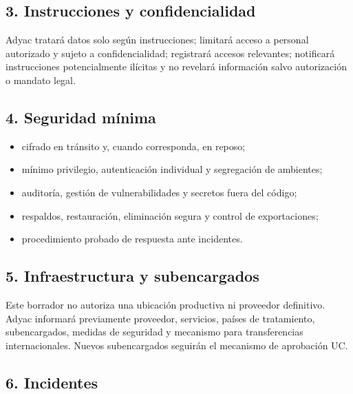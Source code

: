 \documentclass[
]{article}
\providecommand{\tightlist}{%
  \setlength{\itemsep}{0pt}\setlength{\parskip}{0pt}}
\begin{document}
\hypertarget{3-instrucciones-y-confidencialidad}{%
\subsection{3. Instrucciones y
confidencialidad}\label{3-instrucciones-y-confidencialidad}}

Adyac tratará datos solo según instrucciones; limitará acceso a personal
autorizado y sujeto a confidencialidad; registrará accesos relevantes;
notificará instrucciones potencialmente ilícitas y no revelará
información salvo autorización o mandato legal.

\hypertarget{4-seguridad-muxednima}{%
\subsection{4. Seguridad mínima}\label{4-seguridad-muxednima}}

\begin{itemize}
\tightlist
\item
  cifrado en tránsito y, cuando corresponda, en reposo;
\item
  mínimo privilegio, autenticación individual y segregación de
  ambientes;
\item
  auditoría, gestión de vulnerabilidades y secretos fuera del código;
\item
  respaldos, restauración, eliminación segura y control de
  exportaciones;
\item
  procedimiento probado de respuesta ante incidentes.
\end{itemize}

\hypertarget{5-infraestructura-y-subencargados}{%
\subsection{5. Infraestructura y
subencargados}\label{5-infraestructura-y-subencargados}}

Este borrador no autoriza una ubicación productiva ni proveedor
definitivo. Adyac informará previamente proveedor, servicios, países de
tratamiento, subencargados, medidas de seguridad y mecanismo para
transferencias internacionales. Nuevos subencargados seguirán el
mecanismo de aprobación UC.

\hypertarget{6-incidentes}{%
\subsection{6. Incidentes}\label{6-incidentes}}
\end{document}
